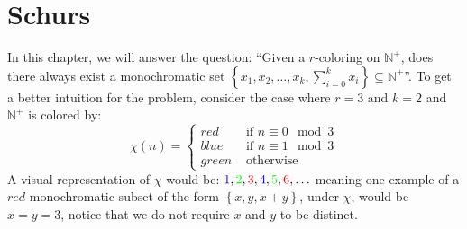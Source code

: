 \chapter{Schurs}
In this chapter, we will answer the question: ``Given a $r$-coloring on $\mathbb{N}^+$, does there always exist a monochromatic set $\left\{x_1, x_2, \ldots, x_{k}, \sum_{i = 0}^k x_i\right\} \subseteq \mathbb{N}^+$''. To get a better intuition for the problem, consider the case where $r = 3$ and $k = 2$ and $\mathbb{N}^+$ is colored by:
\begin{equation*}
	\chi(n) = \begin{cases} red   & \text{ if } n \equiv 0 \mod 3  \\
              blue  & \text{ if }  n \equiv 1 \mod 3 \\
              green & \text{ otherwise }
	\end{cases}
\end{equation*}
A visual representation of $\chi$ would be: $\textcolor{blue}{1}, \textcolor{green}{2}, \textcolor{red}{3}, \textcolor{blue}{4}, \textcolor{green}{5}, \textcolor{red}{6}, \ldots$ meaning one example of a $red$-monochromatic subset of the form $\left\{x, y, x + y\right\}$, under $\chi$, would be $x = y = 3$, notice that we do not require $x$ and $y$ to be distinct.

